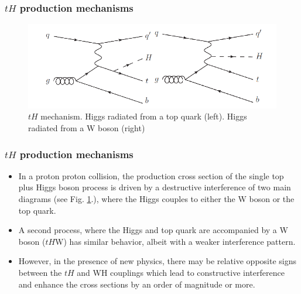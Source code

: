 \documentclass[11pt]{beamer}
\begin{document}
\begin{frame}
\frametitle{$tH$ production mechanisms}
\begin{center}
\begin{figure} 
\includegraphics[scale=0.4]{figures/tq.png} 
\caption*{$tH$ mechanism. Higgs radiated from a top quark (left). Higgs radiated from a W boson (right)} 
\label{th}
\end{figure}
\end{center}
\end{frame}

\begin{frame}
\frametitle{$tH$ production mechanisms}
\begin{itemize}
\item In a proton proton collision, the production cross section of the single top plus Higgs boson process is driven by a
destructive interference of two main diagrams (see Fig. \ref{th}.), where the Higgs couples to either
the W boson or the top quark. 
\item  A second process, where the Higgs and top quark
are accompanied by a W boson ($tH$W) has similar behavior, albeit with a weaker interference
pattern.
\item However, in the presence of new physics, there may be relative opposite signs between the $tH$
and WH couplings which lead to constructive interference and enhance the cross sections by
an order of magnitude or more.
\end{itemize}
\end{frame}
\end{document}
